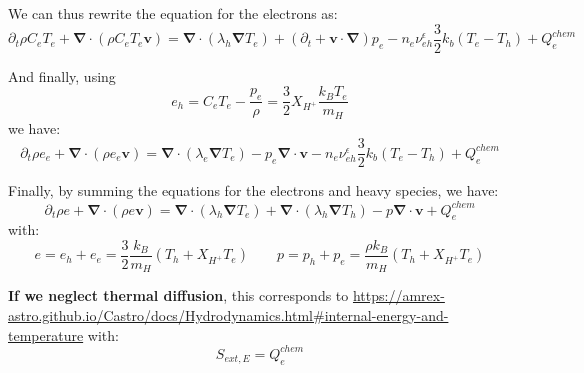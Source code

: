 \documentclass[11pt, oneside]{article}   	%
\begin{document}
We can thus rewrite the equation for the electrons as:
\[ \partial_t \rho C_e T_e + \boldsymbol{\nabla}\cdot(\rho C_e T_e \boldsymbol{v}) = \boldsymbol{\nabla}\cdot(\lambda_h\boldsymbol{\nabla}T_e) + (\partial_t + \boldsymbol{v}\cdot\boldsymbol{\nabla})p_e - n_e\nu_{eh}^\epsilon \frac{3}{2}k_b(T_e - T_h) + Q_e^{chem} \]

And finally, using
\[ e_h = C_e T_e - \frac{p_e}{\rho} = \frac{3}{2}X_{H^+}\frac{k_B T_e}{m_H} \]
we have:
\[ \partial_t \rho e_e + \boldsymbol{\nabla}\cdot(\rho e_e \boldsymbol{v}) = \boldsymbol{\nabla}\cdot(\lambda_e\boldsymbol{\nabla}T_e) - p_e\boldsymbol{\nabla}\cdot\boldsymbol{v} - n_e\nu_{eh}^\epsilon \frac{3}{2}k_b(T_e - T_h) + Q_e^{chem} \]

Finally, by summing the equations for the electrons and heavy species, we have:
\[  \partial_t \rho e + \boldsymbol{\nabla}\cdot(\rho e \boldsymbol{v}) = \boldsymbol{\nabla}\cdot(\lambda_h\boldsymbol{\nabla}T_e) + \boldsymbol{\nabla}\cdot(\lambda_h\boldsymbol{\nabla}T_h) - p\boldsymbol{\nabla}\cdot\boldsymbol{v} + Q_e^{chem} \]
with:
\[ e = e_h + e_e =  \frac{3}{2}\frac{k_B}{m_H}(T_h + X_{H^+}T_e) \qquad p = p_h + p_e = \frac{\rho k_B}{m_H}(T_h + X_{H^+}T_e) \]

\textbf{If we neglect thermal diffusion}, this corresponds to \url{https://amrex-astro.github.io/Castro/docs/Hydrodynamics.html#internal-energy-and-temperature} with:
\[ S_{ext, E} = Q_e^{chem} \]
\end{document}
